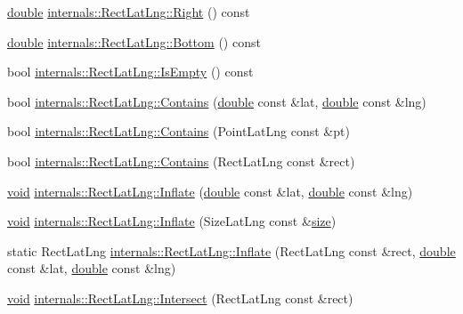 \begin{DoxyCompactItemize}
\item 
\hyperlink{_super_l_u_support_8h_a8956b2b9f49bf918deed98379d159ca7}{double} \hyperlink{group___o_p_map_widget_ga1a6604525748f3a62fb2e026bd5a4e9d}{internals\-::\-Rect\-Lat\-Lng\-::\-Right} () const 
\item 
\hyperlink{_super_l_u_support_8h_a8956b2b9f49bf918deed98379d159ca7}{double} \hyperlink{group___o_p_map_widget_ga56065ec26f127c4763bcb6002a1f4e23}{internals\-::\-Rect\-Lat\-Lng\-::\-Bottom} () const 
\item 
bool \hyperlink{group___o_p_map_widget_ga4b7818f2eee94eb3c8ecb308da6a4c1b}{internals\-::\-Rect\-Lat\-Lng\-::\-Is\-Empty} () const 
\item 
bool \hyperlink{group___o_p_map_widget_ga08c25e5064c11d63c96a89619f027b89}{internals\-::\-Rect\-Lat\-Lng\-::\-Contains} (\hyperlink{_super_l_u_support_8h_a8956b2b9f49bf918deed98379d159ca7}{double} const \&lat, \hyperlink{_super_l_u_support_8h_a8956b2b9f49bf918deed98379d159ca7}{double} const \&lng)
\item 
bool \hyperlink{group___o_p_map_widget_ga15911b1ea5d85590ac05427410787b40}{internals\-::\-Rect\-Lat\-Lng\-::\-Contains} (Point\-Lat\-Lng const \&pt)
\item 
bool \hyperlink{group___o_p_map_widget_gafd896574ac80e5ee28f536db3a8391a2}{internals\-::\-Rect\-Lat\-Lng\-::\-Contains} (Rect\-Lat\-Lng const \&rect)
\item 
\hyperlink{group___u_a_v_objects_plugin_ga444cf2ff3f0ecbe028adce838d373f5c}{void} \hyperlink{group___o_p_map_widget_gaff9d1cc5fb1f00965fad7de448ee3aa3}{internals\-::\-Rect\-Lat\-Lng\-::\-Inflate} (\hyperlink{_super_l_u_support_8h_a8956b2b9f49bf918deed98379d159ca7}{double} const \&lat, \hyperlink{_super_l_u_support_8h_a8956b2b9f49bf918deed98379d159ca7}{double} const \&lng)
\item 
\hyperlink{group___u_a_v_objects_plugin_ga444cf2ff3f0ecbe028adce838d373f5c}{void} \hyperlink{group___o_p_map_widget_gab43105de3a7b0711e47f7e02e0359f2c}{internals\-::\-Rect\-Lat\-Lng\-::\-Inflate} (Size\-Lat\-Lng const \&\hyperlink{glext_8h_a014d89bd76f74ef3a29c8f04b473eb76}{size})
\item 
static Rect\-Lat\-Lng \hyperlink{group___o_p_map_widget_ga41e7a0b707e7e348e2d4f9b8aa3f2831}{internals\-::\-Rect\-Lat\-Lng\-::\-Inflate} (Rect\-Lat\-Lng const \&rect, \hyperlink{_super_l_u_support_8h_a8956b2b9f49bf918deed98379d159ca7}{double} const \&lat, \hyperlink{_super_l_u_support_8h_a8956b2b9f49bf918deed98379d159ca7}{double} const \&lng)
\item 
\hyperlink{group___u_a_v_objects_plugin_ga444cf2ff3f0ecbe028adce838d373f5c}{void} \hyperlink{group___o_p_map_widget_ga829f6c41bb7332b5c596f417157972a7}{internals\-::\-Rect\-Lat\-Lng\-::\-Intersect} (Rect\-Lat\-Lng const \&rect)

\end{DoxyCompactItemize}
